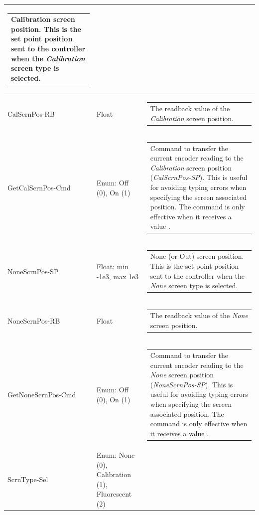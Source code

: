 \documentclass[openany]{article}
\begin{document}
\begin{longtable}{| m{4.5cm} m{2.5cm}  m{7.0cm} |}
\begin{tabular}{@{}m{6cm}@{}}
                Calibration screen position. This is the set point position sent to the controller when the \emph{Calibration} screen type is selected.
            \end{tabular} \hypertarget{}{}\\ \hline
        CalScrnPos-RB & Float & \begin{tabular}{@{}m{6cm}@{}}
                The readback value of the \emph{Calibration} screen position.
            \end{tabular} \hypertarget{pv:get-cal-scrn-pos-cmd}{}\\ \hline
        GetCalScrnPos-Cmd & Enum: Off (0), On (1) & \begin{tabular}{@{}m{6cm}@{}}
                Command to transfer the current encoder reading to the \emph{Calibration} screen position (\emph{CalScrnPos-SP}). This is useful for avoiding typing errors when specifying the screen associated position. The command is only effective when it receives a value $\neq 0$.
            \end{tabular} \hypertarget{pv:none-scrn-pos}{}\\ \hline
        NoneScrnPos-SP & Float: min -1e3, max 1e3 & \begin{tabular}{@{}m{6cm}@{}}
                None (or Out) screen position. This is the set point position sent to the controller when the \emph{None} screen type is selected.
            \end{tabular} \hypertarget{}{}\\ \hline
        NoneScrnPos-RB & Float & \begin{tabular}{@{}m{6cm}@{}}
                The readback value of the \emph{None} screen position.
            \end{tabular} \hypertarget{pv:get-none-scrn-pos-cmd}{}\\ \hline
        GetNoneScrnPos-Cmd & Enum: Off (0), On (1) & \begin{tabular}{@{}m{6cm}@{}}
                Command to transfer the current encoder reading to the \emph{None} screen position (\emph{NoneScrnPos-SP}). This is useful for avoiding typing errors when specifying the screen associated position. The command is only effective when it receives a value $\neq 0$.
            \end{tabular} \hypertarget{pv:scrn-type}{}\\ \hline
        ScrnType-Sel & Enum: None (0), Calibration (1), Fluorescent (2) & \begin{tabular}{@{}m{6cm}@{}}

\end{tabular}
\end{longtable}
\end{document}
